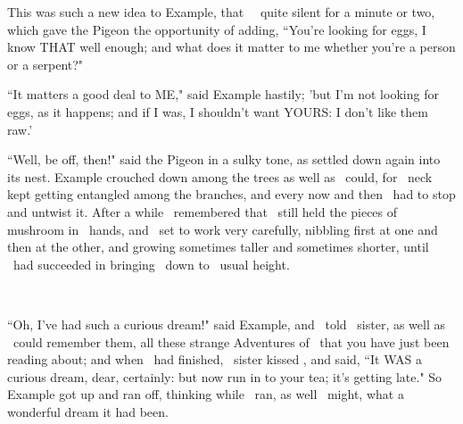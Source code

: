 \documentclass{article}
\begin{document}
\set
This was such a new idea to Example, that \they\ \were\ quite silent for a minute or two, which gave the Pigeon the opportunity of adding, ``You're looking for eggs, I know THAT well enough; and what does it matter to me whether you're a person or a serpent?"

\set
``It matters a good deal to ME," said Example hastily; 'but I'm not looking for eggs, as it happens; and if I was, I shouldn't want YOURS: I don't like them raw.'

\set
``Well, be off, then!" said the Pigeon in a sulky tone, as \they[2] settled down again into its nest. Example crouched down among the trees as well as \they\ could, for \their\ neck kept getting entangled among the branches, and every now and then \they\ had to stop and untwist it. After a while \they\ remembered that \they\ still held the pieces of mushroom in \their\ hands, and \they\ set to work very carefully, nibbling first at one and then at the other, and growing sometimes taller and sometimes shorter, until \they\ had succeeded in bringing \themself\ down to \their\ usual height.

~

\set
``Oh, I've had such a curious dream!" said Example, and \they\ told \their\ sister, as well as \they\ could remember them, all these strange Adventures of \theirs\ that you have just been reading about; and when \they\ had finished, \their\ sister kissed \them, and said, ``It WAS a curious dream, dear, certainly: but now run in to your tea; it's getting late." So Example got up and ran off, thinking while \they\ ran, as well \they\ might, what a wonderful dream it had been.
\end{document}
